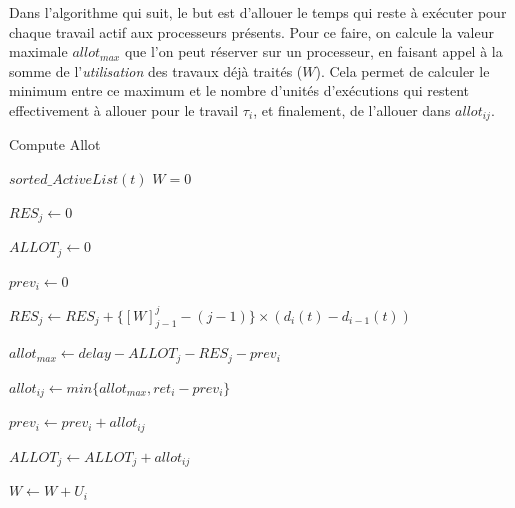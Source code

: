 	Dans l'algorithme qui suit, le but est d'\og{}allouer\fg{} le temps qui reste à exécuter pour chaque travail 
	actif aux processeurs présents.
	Pour ce faire, on calcule la valeur maximale $allot_{max}$ que l'on peut réserver sur un processeur, 
	en faisant appel à la somme de l'\textit{utilisation} des travaux déjà traités ($W$).
	Cela permet de calculer le minimum entre ce maximum et le nombre d'unités d'exécutions qui 
	restent effectivement à allouer pour le travail $\tau_i$, et finalement, de l'allouer dans 
	$allot_{ij}$.

	\label{algouedf}
	\begin{algorithm}[H]
		\caption{Compute Allot}
		\begin{algorithmic}
			\REQUIRE $sorted\_ActiveList(t)$
			\STATE $W = 0$
			
				\item $RES_j \leftarrow 0$
				\item $ALLOT_j \leftarrow 0$
			\ENDFOR
	
				\item $prev_i \leftarrow 0$
					\item $RES_j \leftarrow RES_j + \{[W]_{j-1}^{j} - (j - 1)\}\times (d_i(t) - d_{i-1}(t))$
					\item $allot_{max} \leftarrow delay - ALLOT_j - RES_j - prev_i$
					\item $allot_{ij} \leftarrow min\{allot_{max}, ret_i - prev_i\}$
					\item $prev_i \leftarrow prev_i + allot_{ij}$
					\item $ALLOT_j \leftarrow ALLOT_j + allot_{ij}$
				\ENDFOR
				\item $W \leftarrow W + U_i$
			\ENDFOR
		\end{algorithmic}
	\end{algorithm}
	
